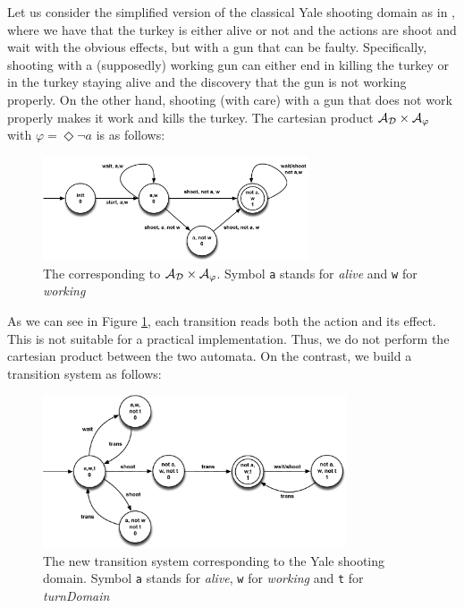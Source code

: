 \begin{example}\label{ex:yale-scenario}
Let us consider the simplified version of the classical Yale shooting domain \citep{hanks1986default} as in \cite{de2018automata}, where we have that the turkey is either alive or not and the actions are shoot and wait with the obvious effects, but with a gun that can be faulty. Specifically, shooting with a (supposedly) working gun can either end in killing the turkey or in the turkey staying alive and the discovery that the gun is not working properly. On the other hand, shooting (with care) with a gun that does not work properly makes it work and kills the turkey. The cartesian product $\mathcal{A}_{\mathcal{D}} \times \mathcal{A}_\varphi$ with $\varphi = \Diamond\lnot a$ is as follows:

\begin{figure}[h]
\centering
\includegraphics[width=0.7\textwidth]{images/cartesian-prod}
\caption{The \DFA corresponding to $\mathcal{A}_{\mathcal{D}} \times \mathcal{A}_\varphi$. Symbol \texttt{a} stands for \textit{alive} and \texttt{w} for \textit{working}} 
\label{fig:dfa-game}
\end{figure}

\noindent As we can see in Figure \ref{fig:dfa-game}, each transition reads both the action and its effect. This is not suitable for a practical implementation. Thus, we do not perform the cartesian product between the two automata. On the contrast, we build a transition system as follows:

\begin{figure}[h]
\centering
\includegraphics[width=0.8\textwidth]{images/yale-our-sol}
\caption{The new transition system corresponding to the Yale shooting domain. Symbol \texttt{a} stands for \textit{alive}, \texttt{w} for \textit{working} and \texttt{t} for \textit{turnDomain}} 
\label{fig:yale-our-sol}
\end{figure}
\end{example}

